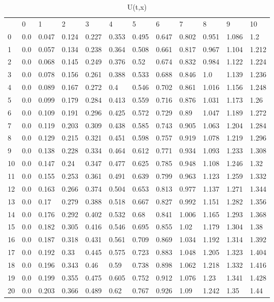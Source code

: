\documentclass[a4paper,fontsize=14pt]{article}
\begin{document}
	\begin{table}[h]
		\begin{tabular}{llllllllllll}
			& 0   & 1     & 2     & 3     & 4     & 5     & 6     & 7     & 8     & 9     & 10    \\
			0  & 0.0 & 0.047 & 0.124 & 0.227 & 0.353 & 0.495 & 0.647 & 0.802 & 0.951 & 1.086 & 1.2   \\
			1  & 0.0 & 0.057 & 0.134 & 0.238 & 0.364 & 0.508 & 0.661 & 0.817 & 0.967 & 1.104 & 1.212 \\
			2  & 0.0 & 0.068 & 0.145 & 0.249 & 0.376 & 0.52  & 0.674 & 0.832 & 0.984 & 1.122 & 1.224 \\
			3  & 0.0 & 0.078 & 0.156 & 0.261 & 0.388 & 0.533 & 0.688 & 0.846 & 1.0   & 1.139 & 1.236 \\
			4  & 0.0 & 0.089 & 0.167 & 0.272 & 0.4   & 0.546 & 0.702 & 0.861 & 1.016 & 1.156 & 1.248 \\
			5  & 0.0 & 0.099 & 0.179 & 0.284 & 0.413 & 0.559 & 0.716 & 0.876 & 1.031 & 1.173 & 1.26  \\
			6  & 0.0 & 0.109 & 0.191 & 0.296 & 0.425 & 0.572 & 0.729 & 0.89  & 1.047 & 1.189 & 1.272 \\
			7  & 0.0 & 0.119 & 0.203 & 0.309 & 0.438 & 0.585 & 0.743 & 0.905 & 1.063 & 1.204 & 1.284 \\
			8  & 0.0 & 0.129 & 0.215 & 0.321 & 0.451 & 0.598 & 0.757 & 0.919 & 1.078 & 1.219 & 1.296 \\
			9  & 0.0 & 0.138 & 0.228 & 0.334 & 0.464 & 0.612 & 0.771 & 0.934 & 1.093 & 1.233 & 1.308 \\
			10 & 0.0 & 0.147 & 0.24  & 0.347 & 0.477 & 0.625 & 0.785 & 0.948 & 1.108 & 1.246 & 1.32  \\
			11 & 0.0 & 0.155 & 0.253 & 0.361 & 0.491 & 0.639 & 0.799 & 0.963 & 1.123 & 1.259 & 1.332 \\
			12 & 0.0 & 0.163 & 0.266 & 0.374 & 0.504 & 0.653 & 0.813 & 0.977 & 1.137 & 1.271 & 1.344 \\
			13 & 0.0 & 0.17  & 0.279 & 0.388 & 0.518 & 0.667 & 0.827 & 0.992 & 1.151 & 1.282 & 1.356 \\
			14 & 0.0 & 0.176 & 0.292 & 0.402 & 0.532 & 0.68  & 0.841 & 1.006 & 1.165 & 1.293 & 1.368 \\
			15 & 0.0 & 0.182 & 0.305 & 0.416 & 0.546 & 0.695 & 0.855 & 1.02  & 1.179 & 1.304 & 1.38  \\
			16 & 0.0 & 0.187 & 0.318 & 0.431 & 0.561 & 0.709 & 0.869 & 1.034 & 1.192 & 1.314 & 1.392 \\
			17 & 0.0 & 0.192 & 0.33  & 0.445 & 0.575 & 0.723 & 0.883 & 1.048 & 1.205 & 1.323 & 1.404 \\
			18 & 0.0 & 0.196 & 0.343 & 0.46  & 0.59  & 0.738 & 0.898 & 1.062 & 1.218 & 1.332 & 1.416 \\
			19 & 0.0 & 0.199 & 0.355 & 0.475 & 0.605 & 0.752 & 0.912 & 1.076 & 1.23  & 1.341 & 1.428 \\
			20 & 0.0 & 0.203 & 0.366 & 0.489 & 0.62  & 0.767 & 0.926 & 1.09  & 1.242 & 1.35  & 1.44  \\
		\end{tabular}
		\caption{U(t,x)}
	\end{table}
	
\end{document}
